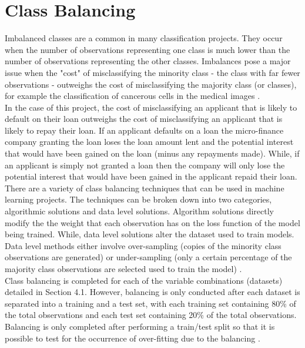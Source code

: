 \section{Class Balancing}

Imbalanced classes are a common in many classification projects. They occur when the number of observations representing one class is much lower than the number of observations representing the other classes. Imbalances pose a major issue when the "cost" of misclassifying the minority class - the class with far fewer observations - outweighs the cost of misclassifying the majority class (or classes), for example the classification of cancerous cells in the medical images \parencite{Balancing2}. \\

In the case of this project, the cost of misclassifying an applicant that is likely to default on their loan outweighs the cost of misclassifying an applicant that is likely to repay their loan. If an applicant defaults on a loan the micro-finance company granting the loan loses the loan amount lent and the potential interest that would have been gained on the loan (minus any repayments made). While, if an applicant is simply not granted a loan then the company will only lose the potential interest that would have been gained in the applicant repaid their loan.  \\

There are a variety of class balancing techniques that can be used in machine learning projects. The techniques can be broken down into two categories, algorithmic solutions and data level solutions. Algorithm solutions directly modify the the weight that each observation has on the loss function of the model being trained. While, data level solutions alter the dataset used to train models. Data level methods either involve over-sampling (copies of the minority class observations are generated) or under-sampling (only a certain percentage of the majority class observations are selected used to train the model) \parencite{Balancing1}. \\

Class balancing is completed for each of the variable combinations (datasets) detailed in Section 4.1. However, balancing is only conducted after each dataset is separated into a training and a test set, with each training set containing 80\% of the total observations and each test set containing 20\% of the total observations. Balancing is only completed after performing a train/test split so that it is possible to test for the occurrence of over-fitting due to the balancing \parencite{Balancing2}. \\

